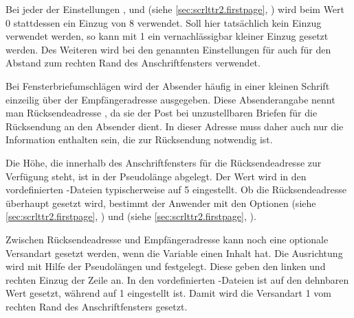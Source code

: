 Bei jeder der
Einstellungen
,
%
 und
%
 (siehe
\autoref{sec:scrlttr2.firstpage},
) wird beim Wert 0
stattdessen ein Einzug von 8 verwendet. Soll hier tatsächlich kein
Einzug verwendet werden, so kann mit 1 ein vernachlässigbar kleiner
Einzug gesetzt werden. Des Weiteren wird  bei den
genannten Einstellungen für  auch für den Abstand zum
rechten Rand des Anschriftfensters verwendet.%
\EndIndexGroup


\begin{Declaration}
\end{Declaration}
Bei Fensterbriefumschlägen wird der Absender häufig in einer kleinen Schrift
einzeilig über der Empfängeradresse ausgegeben. Diese Absenderangabe nennt man
Rücksendeadresse%
, da sie der Post bei unzustellbaren Briefen für die Rücksendung
an den Absender dient. In dieser Adresse muss daher auch nur die Information
enthalten sein, die zur Rücksendung notwendig ist.

Die Höhe, die innerhalb des Anschriftfensters für die Rücksendeadresse zur
Verfügung steht, ist in der Pseudolänge  abgelegt. Der
Wert wird in den vordefinierten -Dateien typischerweise auf
5 eingestellt.  Ob die Rücksendeadresse überhaupt gesetzt wird,
bestimmt der Anwender mit den Optionen  (siehe
\autoref{sec:scrlttr2.firstpage}, ) und
 (siehe \autoref{sec:scrlttr2.firstpage},
).%
\EndIndexGroup


\begin{Declaration}
\end{Declaration}
Zwischen Rücksendeadresse und Empfängeradresse kann noch eine optionale
Versandart gesetzt werden, wenn die Variable  einen
Inhalt hat. Die Ausrichtung wird mit Hilfe der Pseudolängen
 und 
festgelegt. Diese geben den linken und rechten Einzug der Zeile an. In den
vordefinierten -Dateien ist  auf den
dehnbaren Wert  gesetzt, während 
auf 1 eingestellt ist. Damit wird die Versandart 1 vom
rechten Rand des Anschriftfensters gesetzt.%
\EndIndexGroup


